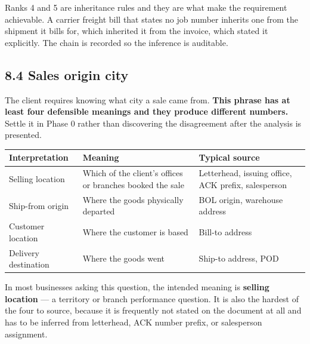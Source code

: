 \documentclass[
]{article}
\newcounter{none} %
\begin{document}
Ranks 4 and 5 are inheritance rules and they are what make the
requirement achievable. A carrier freight bill that states no job number
inherits one from the shipment it bills for, which inherited it from the
invoice, which stated it explicitly. The chain is recorded so the
inference is auditable.

\subsection{8.4 Sales origin city}\label{sales-origin-city}

The client requires knowing what city a sale came from. \textbf{This
phrase has at least four defensible meanings and they produce different
numbers.} Settle it in Phase 0 rather than discovering the disagreement
after the analysis is presented.

{\def\LTcaptype{none} %
\begin{longtable}[]{@{}
  >{\raggedright\arraybackslash}p{}
  >{\raggedright\arraybackslash}p{}
  >{\raggedright\arraybackslash}p{}@{}}
\toprule\noalign{}
\begin{minipage}[b]{\linewidth}\raggedright
Interpretation
\end{minipage} & \begin{minipage}[b]{\linewidth}\raggedright
Meaning
\end{minipage} & \begin{minipage}[b]{\linewidth}\raggedright
Typical source
\end{minipage} \\
\midrule\noalign{}
\endhead
\bottomrule\noalign{}
\endlastfoot
Selling location & Which of the client's offices or branches booked the
sale & Letterhead, issuing office, ACK prefix, salesperson \\
Ship-from origin & Where the goods physically departed & BOL origin,
warehouse address \\
Customer location & Where the customer is based & Bill-to address \\
Delivery destination & Where the goods went & Ship-to address, POD \\
\end{longtable}
}

In most businesses asking this question, the intended meaning is
\textbf{selling location} --- a territory or branch performance
question. It is also the hardest of the four to source, because it is
frequently not stated on the document at all and has to be inferred from
letterhead, ACK number prefix, or salesperson assignment.
\end{document}

